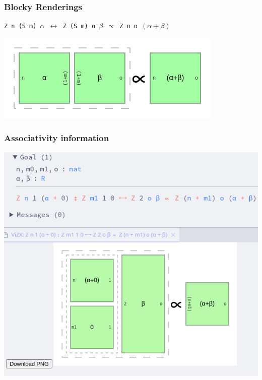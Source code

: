 \documentclass{beamer}
\begin{document}
\begin{frame}
  \frametitle{Blocky Renderings}

  \texttt{Z n (S m) $\alpha$ $\leftrightarrow$ Z (S m) o $\beta$ $\propto$ Z n o $(\alpha + \beta)$}

  \includegraphics[width = \linewidth]{figures/fusionrender.png}

\end{frame}

\begin{frame}
  \frametitle{Associativity information}

  \includegraphics[width = \linewidth]{figures/stackcomposeex.png}

\end{frame}
\end{document}
